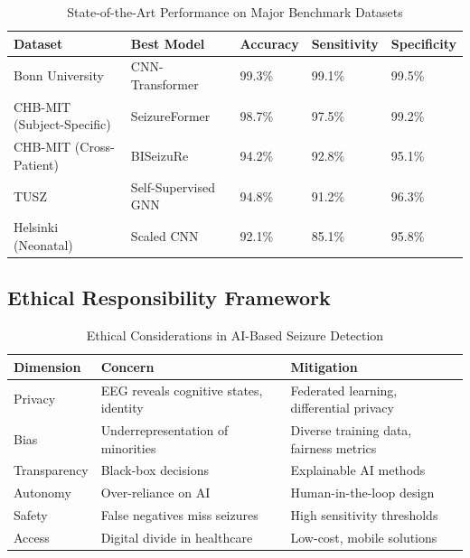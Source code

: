 \documentclass[12pt,a4paper]{article}
\begin{document}
\begin{table}[H]
\centering
\caption{State-of-the-Art Performance on Major Benchmark Datasets}
\label{tab:benchmarks}
\begin{tabular}{lllll}
\toprule
\textbf{Dataset} & \textbf{Best Model} & \textbf{Accuracy} & \textbf{Sensitivity} & \textbf{Specificity} \\
\midrule
Bonn University & CNN-Transformer & 99.3\% & 99.1\% & 99.5\% \\
CHB-MIT (Subject-Specific) & SeizureFormer & 98.7\% & 97.5\% & 99.2\% \\
CHB-MIT (Cross-Patient) & BISeizuRe & 94.2\% & 92.8\% & 95.1\% \\
TUSZ & Self-Supervised GNN & 94.8\% & 91.2\% & 96.3\% \\
Helsinki (Neonatal) & Scaled CNN & 92.1\% & 85.1\% & 95.8\% \\
\bottomrule
\end{tabular}
\end{table}

\subsection{Ethical Responsibility Framework}

\begin{table}[H]
\centering
\caption{Ethical Considerations in AI-Based Seizure Detection}
\label{tab:ethics}
\begin{tabular}{lp{5cm}p{5cm}}
\toprule
\textbf{Dimension} & \textbf{Concern} & \textbf{Mitigation} \\
\midrule
Privacy & EEG reveals cognitive states, identity & Federated learning, differential privacy \\
Bias & Underrepresentation of minorities & Diverse training data, fairness metrics \\
Transparency & Black-box decisions & Explainable AI methods \\
Autonomy & Over-reliance on AI & Human-in-the-loop design \\
Safety & False negatives miss seizures & High sensitivity thresholds \\
Access & Digital divide in healthcare & Low-cost, mobile solutions \\
\bottomrule
\end{tabular}
\end{table}

\end{document}
